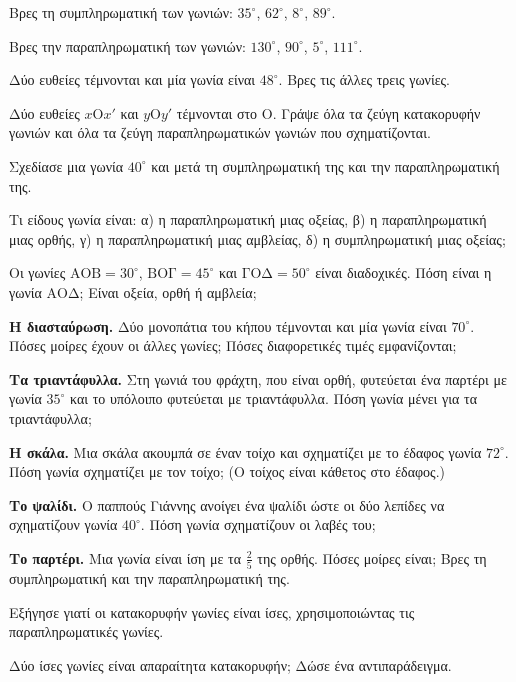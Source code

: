 \ex Βρες τη συμπληρωματική των γωνιών: $35^\circ$, $62^\circ$, $8^\circ$, $89^\circ$.

\ex Βρες την παραπληρωματική των γωνιών: $130^\circ$, $90^\circ$, $5^\circ$, $111^\circ$.

\ex Δύο ευθείες τέμνονται και μία γωνία είναι $48^\circ$. Βρες τις άλλες τρεις γωνίες.

\ex Δύο ευθείες $x\mathrm{Ο}x'$ και $y\mathrm{Ο}y'$ τέμνονται στο $\mathrm{Ο}$. Γράψε όλα τα ζεύγη κατακορυφήν γωνιών και όλα τα ζεύγη παραπληρωματικών γωνιών που σχηματίζονται.

\ex Σχεδίασε μια γωνία $40^\circ$ και μετά τη συμπληρωματική της και την παραπληρωματική της.

\ex Τι είδους γωνία είναι: α) η παραπληρωματική μιας οξείας, β) η παραπληρωματική μιας ορθής, γ) η παραπληρωματική μιας αμβλείας, δ) η συμπληρωματική μιας οξείας;

\ex Οι γωνίες $\mathrm{ΑΟΒ}=30^\circ$, $\mathrm{ΒΟΓ}=45^\circ$ και $\mathrm{ΓΟΔ}=50^\circ$ είναι διαδοχικές. Πόση είναι η γωνία $\mathrm{ΑΟΔ}$; Είναι οξεία, ορθή ή αμβλεία;


\ex \textbf{Η διασταύρωση.} Δύο μονοπάτια του κήπου τέμνονται και μία γωνία είναι $70^\circ$. Πόσες μοίρες έχουν οι άλλες γωνίες; Πόσες διαφορετικές τιμές εμφανίζονται;

\ex \textbf{Τα τριαντάφυλλα.} Στη γωνιά του φράχτη, που είναι ορθή, φυτεύεται ένα παρτέρι με γωνία $35^\circ$ και το υπόλοιπο φυτεύεται με τριαντάφυλλα. Πόση γωνία μένει για τα τριαντάφυλλα;

\ex \textbf{Η σκάλα.} Μια σκάλα ακουμπά σε έναν τοίχο και σχηματίζει με το έδαφος γωνία $72^\circ$. Πόση γωνία σχηματίζει με τον τοίχο; (Ο τοίχος είναι κάθετος στο έδαφος.)

\ex \textbf{Το ψαλίδι.} Ο παππούς Γιάννης ανοίγει ένα ψαλίδι ώστε οι δύο λεπίδες να σχηματίζουν γωνία $40^\circ$. Πόση γωνία σχηματίζουν οι λαβές του;

\ex \textbf{Το παρτέρι.} Μια γωνία είναι ίση με τα $\frac{2}{5}$ της ορθής. Πόσες μοίρες είναι; Βρες τη συμπληρωματική και την παραπληρωματική της.


\ex Εξήγησε γιατί οι κατακορυφήν γωνίες είναι ίσες, χρησιμοποιώντας τις παραπληρωματικές γωνίες.

\ex Δύο ίσες γωνίες είναι απαραίτητα κατακορυφήν; Δώσε ένα αντιπαράδειγμα.


